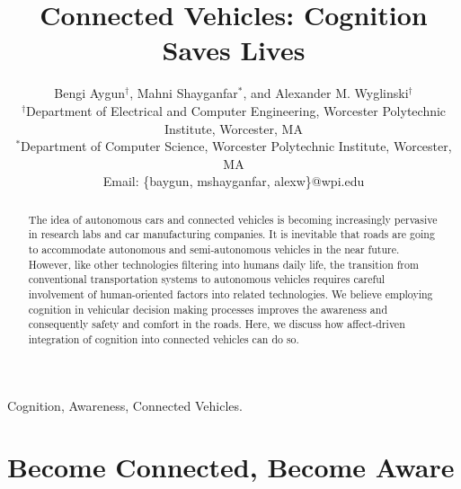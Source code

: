 \documentclass[journal, 11pt]{IEEEtran}
\begin{document}
\title{Connected Vehicles: Cognition Saves Lives}

\author{Bengi Aygun$^\dag$, Mahni Shayganfar$^*$, and Alexander M.
Wyglinski$^\dag$\\
\normalsize $^\dag$Department of Electrical and Computer Engineering, Worcester
Polytechnic Institute, Worcester, MA\\
\normalsize $^*$Department of Computer Science, Worcester Polytechnic Institute,
Worcester, MA\\
\normalsize Email: \{baygun, mshayganfar, alexw\}@wpi.edu}

\maketitle

\begin{abstract}
The idea of autonomous cars and connected vehicles is becoming increasingly
pervasive in research labs and car manufacturing companies. It is inevitable
that roads are going to accommodate autonomous and semi-autonomous vehicles
in the near future. However, like other technologies filtering into humans
daily life, the transition from conventional transportation systems to
autonomous vehicles requires careful involvement of human-oriented factors into
related technologies. We believe employing cognition in vehicular decision
making processes improves the awareness and consequently safety and comfort in
the roads. Here, we discuss how affect-driven integration of cognition into
connected vehicles can do so.
\end{abstract}

\begin{keywords}
Cognition, Awareness, Connected Vehicles.
\end{keywords}%

\IEEEpeerreviewmaketitle

\section{Become Connected, Become Aware}
\end{document}
